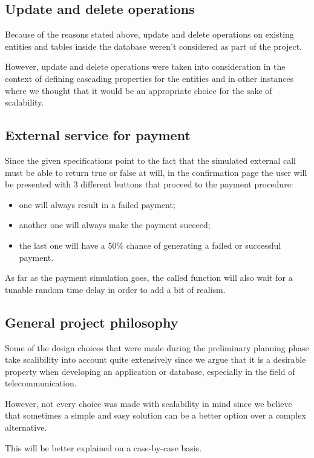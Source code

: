 \subsection*{Update and delete operations}

Because of the reasons stated above, update and delete operations on existing entities and tables inside the database weren't considered as part of the project.

However, update and delete operations were taken into consideration in the context of defining cascading properties for the entities and in other instances where we thought that it would be an appropriate choice for the sake of scalability.

\subsection*{External service for payment}

Since the given specifications point to the fact that the simulated external call must be able to return true or false at will, in the confirmation page the user will be presented with 3 different buttons that proceed to the payment procedure:
\begin{itemize}
    \item one will always result in a failed payment;
    \item another one will always make the payment succeed;
    \item the last one will have a 50\% chance of generating a failed or successful payment.
\end{itemize}

As far as the payment simulation goes, the called function will also wait for a tunable random time delay in order to add a bit of realism.

\subsection*{General project philosophy}

Some of the design choices that were made during the preliminary planning phase take scalibility into account quite extensively since we argue that it is a desirable property when developing an application or database, especially in the field of telecommunication.

However, not every choice was made with scalability in mind since we believe that sometimes a simple and easy solution can be a better option over a complex alternative.

This will be better explained on a case-by-case basis.
